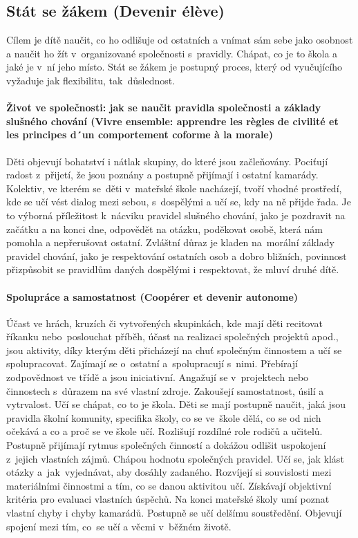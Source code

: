 		\subsection{Stát se žákem (Devenir élève)}
			Cílem je dítě naučit, co ho odlišuje od ostatních a vnímat sám sebe jako osobnost a naučit ho žít v organizované společnosti s pravidly. Chápat, co je to škola a jaké je v ní jeho místo. Stát se žákem je postupný proces, který od vyučujícího vyžaduje jak flexibilitu, tak důslednost.
			\paragraph{Život ve společnosti: jak se naučit pravidla společnosti a základy slušného chování (Vivre ensemble: apprendre les règles de civilité et les principes d´un comportement coforme à la morale)}
				Děti objevují bohatství i nátlak skupiny, do které jsou začleňovány. Pociťují radost z přijetí, že jsou poznány a postupně přijímají i ostatní kamarády. Kolektiv, ve kterém se děti v mateřské škole nacházejí, tvoří vhodné prostředí, kde se učí vést dialog mezi sebou, s dospělými a učí se, kdy na ně přijde řada. Je to výborná příležitost k nácviku pravidel slušného chování, jako je pozdravit na začátku a na konci dne, odpovědět na otázku, poděkovat osobě, která nám pomohla a nepřerušovat ostatní. Zvláštní důraz je kladen na morální základy pravidel chování, jako je respektování ostatních osob a dobro bližních, povinnost přizpůsobit se pravidlům daných dospělými i respektovat, že mluví druhé dítě. 

			\paragraph{Spolupráce a samostatnost (Coopérer et devenir autonome)}
				Účast ve hrách, kruzích či vytvořených skupinkách, kde mají děti recitovat říkanku nebo poslouchat příběh, účast na realizaci společných projektů apod., jsou aktivity, díky kterým děti přicházejí na chuť společným činnostem a učí se spolupracovat. Zajímají se o~ostatní a spolupracují s nimi. Přebírají zodpovědnost ve třídě a jsou iniciativní. Angažují se v projektech nebo činnostech s důrazem na své vlastní zdroje. Zakoušejí samostatnost, úsilí a vytrvalost. Učí se chápat, co to je škola.
				Děti se mají postupně naučit, jaká jsou pravidla školní komunity, specifika školy, co se ve škole dělá, co se od nich očekává a co a proč se ve škole učí. Rozlišují rozdílné role rodičů a učitelů. 
				Postupně přijímají rytmus společných činností a dokážou odlišit uspokojení z jejich vlastních zájmů. Chápou hodnotu společných pravidel. Učí se, jak klást otázky a jak vyjednávat, aby dosáhly zadaného. Rozvíjejí si souvislosti mezi materiálními činnostmi a tím, co se danou aktivitou učí. Získávají objektivní kritéria pro evaluaci vlastních úspěchů. Na konci mateřské školy umí poznat vlastní chyby i chyby kamarádů. Postupně se učí delšímu soustředění. Objevují spojení mezi tím, co se učí a věcmi v běžném životě.
